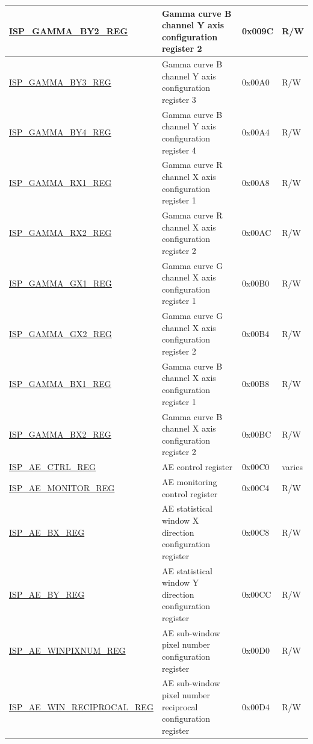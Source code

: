 \begin{longtable}{ | p{6cm} | p{7.2cm} | p{1.3cm} | p{1cm} | }
\hyperref[regdesc:ISPGAMMABY2REG]{ISP\_GAMMA\_BY2\_REG} & Gamma curve B channel Y axis configuration register 2 & 0x009C & R/W \\ \hline
\hyperref[regdesc:ISPGAMMABY3REG]{ISP\_GAMMA\_BY3\_REG} & Gamma curve B channel Y axis configuration register 3 & 0x00A0 & R/W \\ \hline
\hyperref[regdesc:ISPGAMMABY4REG]{ISP\_GAMMA\_BY4\_REG} & Gamma curve B channel Y axis configuration register 4 & 0x00A4 & R/W \\ \hline
\hyperref[regdesc:ISPGAMMARX1REG]{ISP\_GAMMA\_RX1\_REG} & Gamma curve R channel X axis configuration register 1 & 0x00A8 & R/W \\ \hline
\hyperref[regdesc:ISPGAMMARX2REG]{ISP\_GAMMA\_RX2\_REG} & Gamma curve R channel X axis configuration register 2 & 0x00AC & R/W \\ \hline
\hyperref[regdesc:ISPGAMMAGX1REG]{ISP\_GAMMA\_GX1\_REG} & Gamma curve G channel X axis configuration register 1 & 0x00B0 & R/W \\ \hline
\hyperref[regdesc:ISPGAMMAGX2REG]{ISP\_GAMMA\_GX2\_REG} & Gamma curve G channel X axis configuration register 2 & 0x00B4 & R/W \\ \hline
\hyperref[regdesc:ISPGAMMABX1REG]{ISP\_GAMMA\_BX1\_REG} & Gamma curve B channel X axis configuration register 1 & 0x00B8 & R/W \\ \hline
\hyperref[regdesc:ISPGAMMABX2REG]{ISP\_GAMMA\_BX2\_REG} & Gamma curve B channel X axis configuration register 2 & 0x00BC & R/W \\ \hline
\hyperref[regdesc:ISPAECTRLREG]{ISP\_AE\_CTRL\_REG} & AE control register & 0x00C0 & varies \\ \hline
\hyperref[regdesc:ISPAEMONITORREG]{ISP\_AE\_MONITOR\_REG} & AE monitoring control register & 0x00C4 & R/W \\ \hline
\hyperref[regdesc:ISPAEBXREG]{ISP\_AE\_BX\_REG} & AE statistical window X direction configuration register & 0x00C8 & R/W \\ \hline
\hyperref[regdesc:ISPAEBYREG]{ISP\_AE\_BY\_REG} & AE statistical window Y direction configuration register & 0x00CC & R/W \\ \hline
\hyperref[regdesc:ISPAEWINPIXNUMREG]{ISP\_AE\_WINPIXNUM\_REG} & AE sub-window pixel number configuration register & 0x00D0 & R/W \\ \hline
\hyperref[regdesc:ISPAEWINRECIPROCALREG]{ISP\_AE\_WIN\_RECIPROCAL\_REG} & AE sub-window pixel number reciprocal configuration register & 0x00D4 & R/W \\ \hline

\end{longtable}
